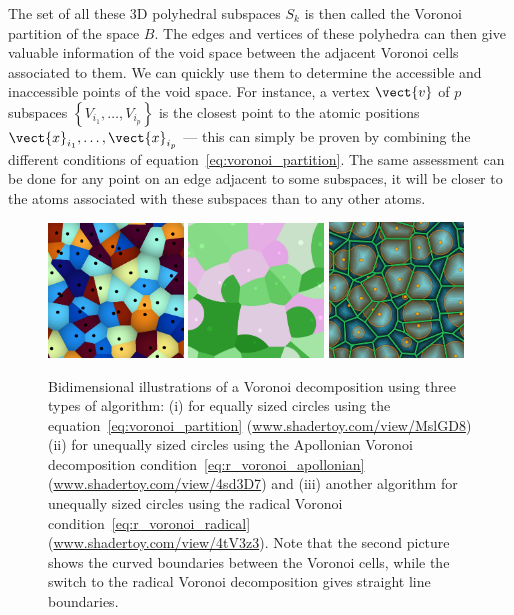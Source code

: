 \documentclass[main]{subfiles}
\begin{document}
The set of all these 3D polyhedral subspaces $S_{k}$ is then called the Voronoi partition of the space $B$. The edges and vertices of these polyhedra can then give valuable information of the void space between the adjacent Voronoi cells associated to them. We can quickly use them to determine the accessible and inaccessible points of the void space. For instance, a vertex $\vect{v}$ of $p$ subspaces $\left\{V_{i_1},\ldots,V_{i_p}\right\}$ is the closest point to the atomic positions $\vect{x}_{i_1},\ldots,\vect{x}_{i_p}$ --- this can simply be proven by combining the different conditions of equation~\ref{eq:voronoi_partition}. The same assessment can be done for any point on an edge adjacent to some subspaces, it will be closer to the atoms associated with these subspaces than to any other atoms. 


\begin{figure}[ht]
  \centering
  \includegraphics[width=0.32\textwidth]{figures/3-fastsim/voronoi.jpg}
  \includegraphics[width=0.32\textwidth]{figures/3-fastsim/voronoi_apollonian.jpg}
  \includegraphics[width=0.32\textwidth]{figures/3-fastsim/voronoi_radical.jpg}
  \caption{Bidimensional illustrations of a Voronoi decomposition using three types of algorithm: (i) for equally sized circles using the equation~\ref{eq:voronoi_partition} (\url{www.shadertoy.com/view/MslGD8}) (ii) for unequally sized circles using the Apollonian Voronoi decomposition condition~\ref{eq:r_voronoi_apollonian} (\url{www.shadertoy.com/view/4sd3D7}) and (iii) another algorithm for unequally sized circles using the radical Voronoi condition~\ref{eq:r_voronoi_radical} (\url{www.shadertoy.com/view/4tV3z3}). Note that the second picture shows the curved boundaries between the Voronoi cells, while the switch to the radical Voronoi decomposition gives straight line boundaries.}\label{fgr:voronoi_illustration}
\end{figure}
\end{document}
